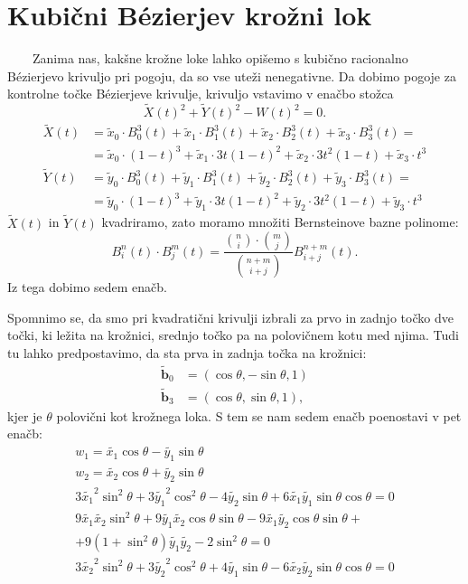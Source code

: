 \documentclass[a4paper,11pt]{article}
\theoremstyle{definition}
\theoremstyle{plain}
\begin{document}
\section{Kubični B\'ezierjev krožni lok}
\ \ \ \
Zanima nas, kakšne krožne loke lahko opišemo s kubično racionalno B\'ezierjevo krivuljo pri pogoju, da so vse uteži nenegativne. Da dobimo pogoje za kontrolne točke B\'ezierjeve krivulje, krivuljo vstavimo v enačbo stožca
$$ \tilde{X}(t)^2+\tilde{Y}(t)^2-W(t)^2=0.$$
\begin{align*}
\tilde{X}(t) &= \tilde{x}_0\cdot B_0^3(t)+\tilde{x}_1\cdot B_1^3(t)+ \tilde{x}_2\cdot B_2^3(t) + \tilde{x}_3\cdot B_3^3(t) = \\
&= \tilde{x}_0\cdot (1-t)^3+\tilde{x}_1\cdot3t(1-t)^2+\tilde{x}_2\cdot3t^2(1-t)+\tilde{x}_3\cdot t^3 \\
\tilde{Y}(t) &=\tilde{y}_0\cdot B_0^3(t)+\tilde{y}_1\cdot B_1^3(t)+\tilde{y}_2\cdot B_2^3(t) + \tilde{y}_3\cdot B_3^3(t) = \\
&= \tilde{y}_0\cdot (1-t)^3+\tilde{y}_1\cdot3t(1-t)^2+\tilde{y}_2\cdot3t^2(1-t)+\tilde{y}_3\cdot t^3 
\end{align*}
$\tilde{X}(t)$ in $\tilde{Y}(t)$ kvadriramo, zato moramo množiti Bernsteinove bazne polinome:
$$B_i^n(t)\cdot B_j^m(t)=\frac{\binom{n}{i} \cdot \binom{m}{j}}{\binom{n+m}{i+j}}B_{i+j}^{n+m}(t).$$
Iz tega dobimo sedem enačb.

Spomnimo se, da smo pri kvadratični krivulji izbrali za prvo in zadnjo točko dve točki, ki ležita na krožnici, srednjo točko pa na polovičnem kotu med njima. Tudi tu lahko predpostavimo, da sta prva in zadnja točka na krožnici:
\begin{align*}
\boldsymbol{\tilde{b}}_0 &= (\cos \theta, -\sin \theta, 1)\\
\boldsymbol{\tilde{b}}_3 &= (\cos \theta, \sin \theta, 1),
\end{align*}
kjer je $\theta$ polovični kot krožnega loka.  S tem se nam sedem enačb poenostavi v pet enačb:
\begin{align*}
w_1 = \tilde{x_1}\cos{\theta} - \tilde{y_1} \sin{\theta}   \\
w_2 = \tilde{x_2}\cos{\theta} + \tilde{y_2} \sin{\theta}   \\
3\tilde{x_1}^2\sin^2{\theta} + 3\tilde{y_1}^2\cos^2{\theta} - 4\tilde{y_2} \sin{\theta}  + 6\tilde{x_1}\tilde{y_1} \sin{\theta} \cos{\theta} = 0 \\
9\tilde{x_1}\tilde{x_2}\sin^2{\theta} + 9\tilde{y_1}\tilde{x_2}\cos{\theta} \sin{\theta} - 9\tilde{x_1} \tilde{y_2} \cos{\theta} \sin{\theta}+ \\
+ 9 (1 + \sin^2{\theta}) \tilde{y_1} \tilde{y_2} - 2\sin^2{\theta} = 0 \\
3\tilde{x_2}^2 \sin^2{\theta}+ 3\tilde{y_2}^2 \cos^2{\theta}+ 4\tilde{y_1} \sin{\theta}  - 6\tilde{x_2}\tilde{y_2}\sin{\theta} \cos{\theta}  = 0 
\end{align*}
\end{document}

